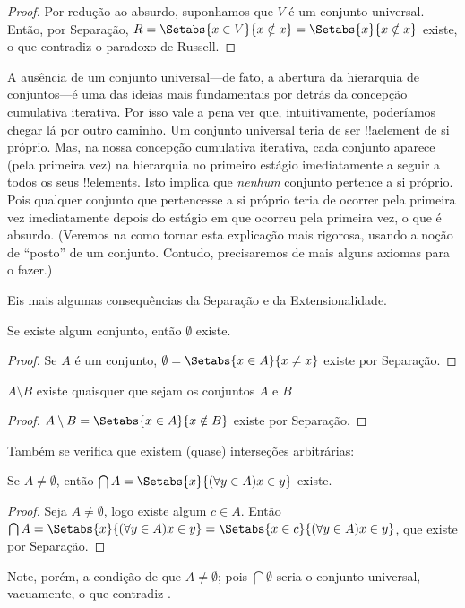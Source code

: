 \documentclass[../../../include/open-logic-section]{subfiles}
\begin{document}
\begin{proof}
Por redução ao absurdo, suponhamos que $V$ é um conjunto universal. Então, por Separação, $R =
\Setabs{x \in V}{x \notin x} = \Setabs{x}{x \notin x}$ existe,
o que contradiz o paradoxo de Russell.
\end{proof}

A ausência de um conjunto universal---de fato, a abertura da
hierarquia de conjuntos---é uma das ideias mais fundamentais por detrás da
concepção cumulativa iterativa. Por isso vale a pena ver que,
intuitivamente, poderíamos chegar lá por outro caminho. Um conjunto universal
teria de ser !!a{element} de si próprio. Mas, na nossa concepção cumulativa iterativa, cada conjunto aparece (pela primeira vez) na hierarquia no
primeiro estágio imediatamente a seguir a todos os seus !!{element}s. Isto implica que \emph{nenhum} conjunto pertence a si próprio. Pois qualquer conjunto que pertencesse a si próprio teria de ocorrer pela primeira vez imediatamente depois do estágio em que ocorreu pela primeira vez, o que é absurdo. (Veremos na
 como tornar esta explicação
mais rigorosa, usando a noção de ``posto'' de um conjunto. Contudo,
precisaremos de mais alguns axiomas para o fazer.)

Eis mais algumas consequências da Separação e da Extensionalidade.

\begin{prop}
Se existe algum conjunto, então $\emptyset$ existe.
\end{prop}

\begin{proof}
Se $A$ é um conjunto, $\emptyset = \Setabs{x \in A}{x \neq x}$ existe por Separação.
\end{proof}

\begin{prop}
$A \setminus B$ existe quaisquer que sejam os conjuntos $A$ e $B$
\end{prop}

\begin{proof}
$A \setminus B = \Setabs{x \in A}{x \notin B}$ existe por Separação.
\end{proof}

Também se verifica que existem (quase) interseções arbitrárias:

\begin{prop}
Se $A \neq \emptyset$, então $\bigcap A = \Setabs{x}{(\forall y \in A)x \in y}$ existe.
\end{prop}

\begin{proof}
Seja $A \neq \emptyset$, logo existe algum $c \in A$. Então $\bigcap A =
\Setabs{x}{(\forall y \in A)x \in y} = \Setabs{x \in c}{(\forall y \in
A)x \in y}$, que existe por Separação.
\end{proof}

Note, porém, a condição de que $A \neq \emptyset$; pois $\bigcap
\emptyset$ seria o conjunto universal, vacuamente, o que contradiz
.
\end{document}
